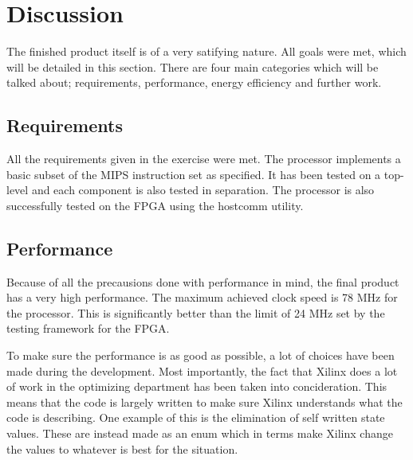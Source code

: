 \section{Discussion}



The finished product itself is of a very satifying nature.
All goals were met, which will be detailed in this section.
There are four main categories which will be talked about;
requirements, performance, energy efficiency and further work.

\subsection{Requirements}
All the requirements given in the exercise were met.
The processor implements a basic subset of the MIPS instruction set \cite[p.64]{compendium} as specified.
It has been tested on a top-level and each component is also tested in separation.
The processor is also successfully tested on the FPGA using the hostcomm \cite{hostcomm} utility.

\subsection{Performance}
Because of all the precausions done with performance in mind, the final product has a very high performance.
The maximum achieved clock speed is 78 MHz for the processor.
This is significantly better than the limit of 24 MHz set by the testing framework for the FPGA.

To make sure the performance is as good as possible, a lot of choices have been made during the development.
Most importantly, the fact that Xilinx does a lot of work in the optimizing department has been taken into concideration.
This means that the code is largely written to make sure Xilinx understands what the code is describing.
One example of this is the elimination of self written state values.
These are instead made as an enum which in terms make Xilinx change the values to whatever is best for the situation.

